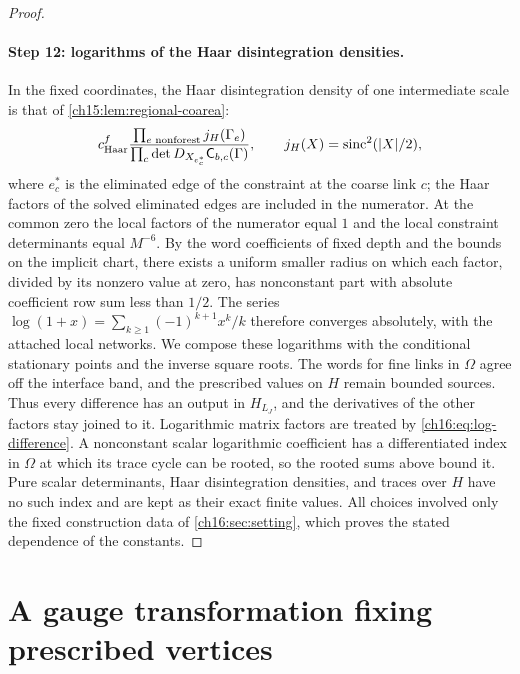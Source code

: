 \begin{proof}
\paragraph{Step 12: logarithms of the Haar disintegration densities.}
In the fixed coordinates, the Haar disintegration density of one intermediate scale is that of \cref{ch15:lem:regional-coarea}:
\begin{equation}\label{ch16:eq:coarea-factor}
 c_{\mathrm{Haar}}^{f}
 \frac{\prod_{e\text{ nonforest}}j_H(\Gamma_e)}
      {\prod_c\det D_{X_{e^*_c}}\mathsf C_{b,c}(\Gamma)},
 \qquad j_H(X)=\operatorname{sinc}^2(|X|/2),
\end{equation}
where $e^*_c$ is the eliminated edge of the constraint at the coarse link $c$; the Haar factors of the solved eliminated edges are included in the numerator. At the common zero the local factors of the numerator equal $1$ and the local constraint determinants equal $M^{-6}$. By the word coefficients of fixed depth and the bounds on the implicit chart, there exists a uniform smaller radius on which each factor, divided by its nonzero value at zero, has nonconstant part with absolute coefficient row sum less than $1/2$. The series $\log(1+x)=\sum_{k\ge1}(-1)^{k+1}x^k/k$ therefore converges absolutely, with the attached local networks. We compose these logarithms with the conditional stationary points and the inverse square roots. The words for fine links in $\Omega$ agree off the interface band, and the prescribed values on $H$ remain bounded sources. Thus every difference has an output in $H_{L_J}$, and the derivatives of the other factors stay joined to it. Logarithmic matrix factors are treated by \eqref{ch16:eq:log-difference}. A nonconstant scalar logarithmic coefficient has a differentiated index in $\Omega$ at which its trace cycle can be rooted, so the rooted sums above bound it. Pure scalar determinants, Haar disintegration densities, and traces over $H$ have no such index and are kept as their exact finite values. All choices involved only the fixed construction data of \cref{ch16:sec:setting}, which proves the stated dependence of the constants.
\end{proof}

\section{A gauge transformation fixing prescribed vertices}\label{ch16:sec:gauge}

